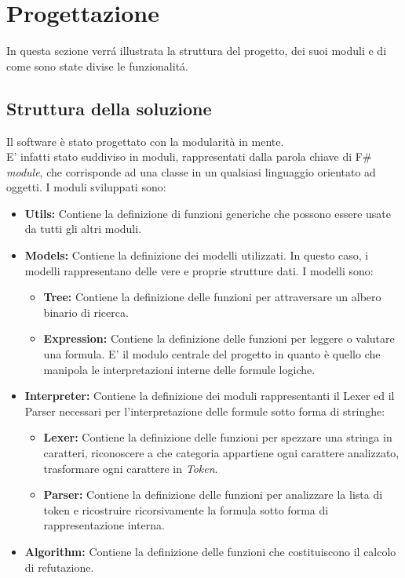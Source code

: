 \documentclass[\main/tesi.tex]{subfiles}
\begin{document}
\chapter{Progettazione}

In questa sezione verr\'a illustrata la struttura del progetto, dei suoi moduli e di come sono state divise le funzionalit\'a. \\

\section{Struttura della soluzione}
Il software è stato progettato con la modularità in mente. \\
E' infatti stato suddiviso in moduli, rappresentati dalla parola chiave di F\# \cite{fsharp} \textit{module}, che corrisponde ad una classe in un qualsiasi linguaggio orientato ad oggetti.
I moduli sviluppati sono:
\begin{itemize}
    \item \textbf{Utils:} Contiene la definizione di funzioni generiche che possono essere usate da tutti gli altri moduli.
    \item \textbf{Models:} Contiene la definizione dei modelli utilizzati. In questo caso, i modelli rappresentano delle vere e proprie strutture dati. I modelli sono:
          \begin{itemize}
              \item \textbf{Tree:} Contiene la definizione delle funzioni per attraversare un albero binario di ricerca.
              \item \textbf{Expression:} Contiene la definizione delle funzioni per leggere o valutare una formula. E' il modulo centrale del progetto in quanto è quello che manipola le interpretazioni interne delle formule logiche.
          \end{itemize}
    \item \textbf{Interpreter:} Contiene la definizione dei moduli rappresentanti il Lexer ed il Parser necessari per l'interpretazione delle formule sotto forma di stringhe:
          \begin{itemize}
              \item \textbf{Lexer:} Contiene la definizione delle funzioni per spezzare una stringa in caratteri, riconoscere a che categoria appartiene ogni carattere analizzato, trasformare ogni carattere in \textit{Token}.
              \item \textbf{Parser:} Contiene la definizione delle funzioni per analizzare la lista di token e ricostruire ricorsivamente la formula sotto forma di rappresentazione interna.
          \end{itemize}
    \item \textbf{Algorithm:} Contiene la definizione delle funzioni che costituiscono il calcolo di refutazione.
\end{itemize}
\end{document}

